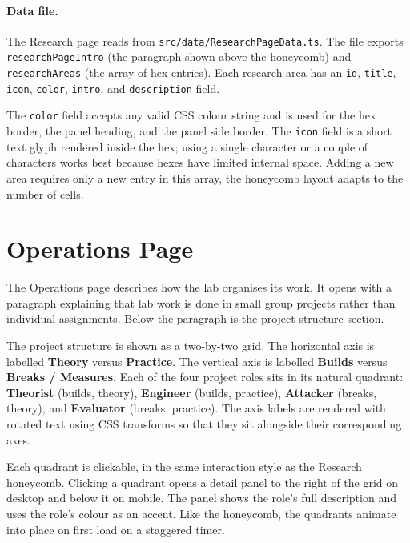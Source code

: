 \paragraph{Data file.} The Research page reads from \texttt{src/data/ResearchPageData.ts}. The file exports \texttt{researchPageIntro} (the paragraph shown above the honeycomb) and \texttt{researchAreas} (the array of hex entries). Each research area has an \texttt{id}, \texttt{title}, \texttt{icon}, \texttt{color}, \texttt{intro}, and \texttt{description} field.

The \texttt{color} field accepts any valid CSS colour string and is used for the hex border, the panel heading, and the panel side border. The \texttt{icon} field is a short text glyph rendered inside the hex; using a single character or a couple of characters works best because hexes have limited internal space. Adding a new area requires only a new entry in this array, the honeycomb layout adapts to the number of cells.

\section{Operations Page}\label{sec:user-operations}

The Operations page describes how the lab organises its work. It opens with a paragraph explaining that lab work is done in small group projects rather than individual assignments. Below the paragraph is the project structure section.

The project structure is shown as a two-by-two grid. The horizontal axis is labelled \textbf{Theory} versus \textbf{Practice}. The vertical axis is labelled \textbf{Builds} versus \textbf{Breaks / Measures}. Each of the four project roles sits in its natural quadrant: \textbf{Theorist} (builds, theory), \textbf{Engineer} (builds, practice), \textbf{Attacker} (breaks, theory), and \textbf{Evaluator} (breaks, practice). The axis labels are rendered with rotated text using CSS transforms so that they sit alongside their corresponding axes.

Each quadrant is clickable, in the same interaction style as the Research honeycomb. Clicking a quadrant opens a detail panel to the right of the grid on desktop and below it on mobile. The panel shows the role's full description and uses the role's colour as an accent. Like the honeycomb, the quadrants animate into place on first load on a staggered timer.

